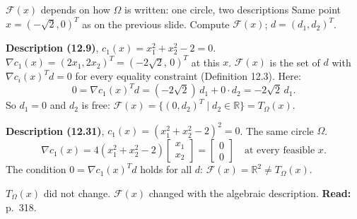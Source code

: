 \documentclass[aspectratio=169,12pt]{beamer}
\newcommand{\R}{\mathbb{R}}
\newcommand{\readbook}[1]{{\color{red}\textbf{Read:} #1}}
\newcommand{\cF}{\mathcal{F}}
\newcommand{\TO}{T_{\Omega}}
\begin{document}
\begin{frame}{$\cF(x)$ depends on how $\Omega$ is written: one circle, two descriptions}
  Same point $x=(-\sqrt2,0)^{T}$ as on the previous slide. Compute $\cF(x)$; $d=(d_{1},d_{2})^{T}$.

  \vspace{0.3em}
  \textbf{Description (12.9)}, $c_{1}(x)=x_{1}^{2}+x_{2}^{2}-2=0$.\\
  $\nabla c_{1}(x)=(2x_{1},2x_{2})^{T}=(-2\sqrt2,\,0)^{T}$ at this $x$.
  $\cF(x)$ is the set of $d$ with $\nabla c_{i}(x)^{T}d=0$ for every equality constraint (Definition 12.3). Here:
  \[ 0=\nabla c_{1}(x)^{T}d=(-2\sqrt2)\,d_{1}+0\cdot d_{2}=-2\sqrt2\,d_{1} . \]
  So $d_{1}=0$ and $d_{2}$ is free: $\cF(x)=\{(0,d_{2})^{T}\mid d_{2}\in\R\}=\TO(x)$.

  \vspace{0.2em}
  \textbf{Description (12.31)}, $c_{1}(x)=(x_{1}^{2}+x_{2}^{2}-2)^{2}=0$. The same circle $\Omega$.
  \[ \nabla c_{1}(x)=4(x_{1}^{2}+x_{2}^{2}-2)\begin{bmatrix}x_{1}\\x_{2}\end{bmatrix}=\begin{bmatrix}0\\0\end{bmatrix}
     \quad\text{at every feasible } x . \]
  The condition $0=\nabla c_{1}(x)^{T}d$ holds for all $d$: $\cF(x)=\R^{2}\ne\TO(x)$.

  $\TO(x)$ did not change. $\cF(x)$ changed with the algebraic description. \readbook{p.~318.}
\end{frame}
\end{document}
